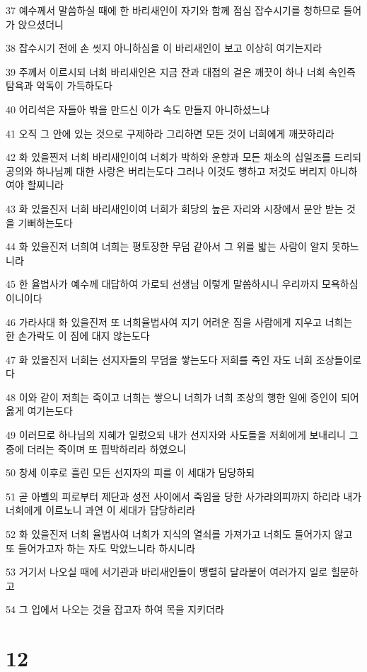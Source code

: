 \par 37 예수께서 말씀하실 때에 한 바리새인이 자기와 함께 점심 잡수시기를 청하므로 들어가 앉으셨더니
\par 38 잡수시기 전에 손 씻지 아니하심을 이 바리새인이 보고 이상히 여기는지라
\par 39 주께서 이르시되 너희 바리새인은 지금 잔과 대접의 겉은 깨끗이 하나 너희 속인즉 탐욕과 악독이 가득하도다
\par 40 어리석은 자들아 밖을 만드신 이가 속도 만들지 아니하셨느냐
\par 41 오직 그 안에 있는 것으로 구제하라 그리하면 모든 것이 너희에게 깨끗하리라
\par 42 화 있을찐저 너희 바리새인이여 너희가 박하와 운향과 모든 채소의 십일조를 드리되 공의와 하나님께 대한 사랑은 버리는도다 그러나 이것도 행하고 저것도 버리지 아니하여야 할찌니라
\par 43 화 있을진저 너희 바리새인이여 너희가 회당의 높은 자리와 시장에서 문안 받는 것을 기뻐하는도다
\par 44 화 있을진저 너희여 너희는 평토장한 무덤 같아서 그 위를 밟는 사람이 알지 못하느니라
\par 45 한 율법사가 예수께 대답하여 가로되 선생님 이렇게 말씀하시니 우리까지 모욕하심이니이다
\par 46 가라사대 화 있을진저 또 너희율법사여 지기 어려운 짐을 사람에게 지우고 너희는 한 손가락도 이 짐에 대지 않는도다
\par 47 화 있을진저 너희는 선지자들의 무덤을 쌓는도다 저희를 죽인 자도 너희 조상들이로다
\par 48 이와 같이 저희는 죽이고 너희는 쌓으니 너희가 너희 조상의 행한 일에 증인이 되어 옳게 여기는도다
\par 49 이러므로 하나님의 지혜가 일렀으되 내가 선지자와 사도들을 저희에게 보내리니 그 중에 더러는 죽이며 또 핍박하리라 하였으니
\par 50 창세 이후로 흘린 모든 선지자의 피를 이 세대가 담당하되
\par 51 곧 아벨의 피로부터 제단과 성전 사이에서 죽임을 당한 사가랴의피까지 하리라 내가 너희에게 이르노니 과연 이 세대가 담당하리라
\par 52 화 있을진저 너희 율법사여 너희가 지식의 열쇠를 가져가고 너희도 들어가지 않고 또 들어가고자 하는 자도 막았느니라 하시니라
\par 53 거기서 나오실 때에 서기관과 바리새인들이 맹렬히 달라붙어 여러가지 일로 힐문하고
\par 54 그 입에서 나오는 것을 잡고자 하여 목을 지키더라

\chapter{12}

